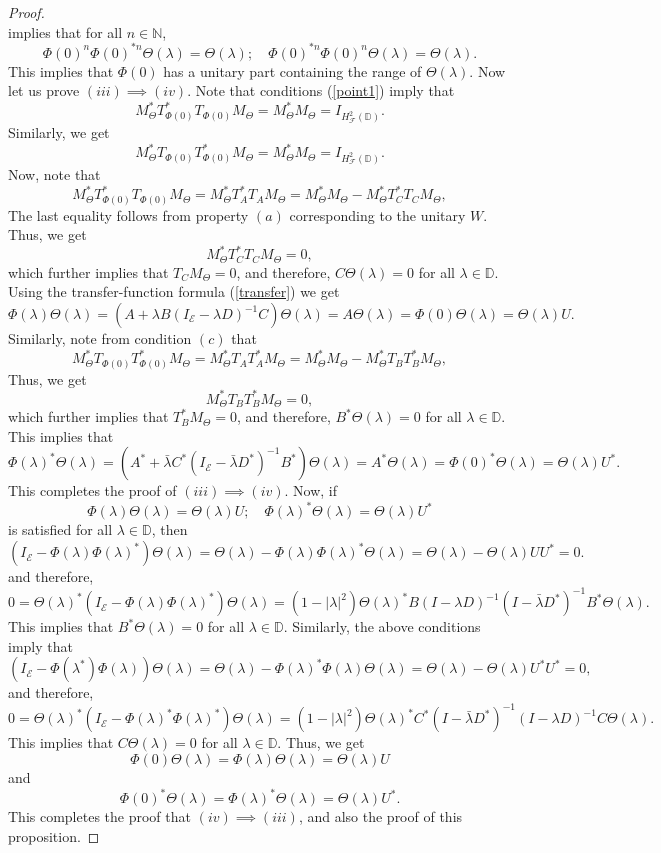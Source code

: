\documentclass[12pt]{amsart}
\numberwithin{equation}{section}
\theoremstyle{definition}
\newcommand{\Nat}{\mathbb{N}}
\newcommand{\D}{\mathbb{D}}
\newcommand{\1}{{\mbox{\bf 1}}}
\newcommand{\cle}{\mathcal{E}}
\newcommand{\clf}{\mathcal{F}}
\begin{document}
\begin{proof}
\[\]
implies that for all $n \in \Nat$,
\[
\Phi(0)^{n} \Phi(0)^{*n} \Theta(\lambda)  = \Theta(\lambda); \quad \Phi(0)^{*n} \Phi(0)^{n} \Theta(\lambda) =  \Theta(\lambda).
\]
This implies that $\Phi(0)$ has a unitary part containing the range of  $\Theta(\lambda)$. Now let us prove  $(iii) \implies (iv)$. Note that conditions (\ref{point1}) imply that
\[
M_{\Theta}^* T_{\Phi(0)}^* T_{\Phi(0)}M_{\Theta} = M_{\Theta}^*M_{\Theta} = I_{H_{\clf}^2(\D)}.
\]
Similarly, we get
\[
M_{\Theta}^* T_{\Phi(0)} T_{\Phi(0)}^*M_{\Theta} = M_{\Theta}^*M_{\Theta} = I_{H_{\clf}^2(\D)}.
\]
Now, note that 
\[
M_{\Theta}^* T_{\Phi(0)}^* T_{\Phi(0)}M_{\Theta} = M_{\Theta}^*  T_A^* T_A M_{\Theta}  = M_{\Theta}^* M_{\Theta} - M_{\Theta}^*  T_C^* T_C M_{\Theta},
\]
The last equality follows from property $(a)$ corresponding to the unitary $W$. Thus, we get 
\[
M_{\Theta}^*  T_C^* T_C M_{\Theta} = 0,
\]
which further implies that $T_C M_{\Theta} = 0$, and therefore, $C \Theta(\lambda) = 0$ for all $\lambda \in \D$.  Using the transfer-function formula (\ref{transfer}) we get
\[
\Phi(\lambda) \Theta(\lambda) = ( A + \lambda B (I_{\cle} - \lambda D)^{-1} C)\Theta(\lambda) = A \Theta(\lambda) = \Phi(0) \Theta(\lambda) = \Theta(\lambda) U.
\]
Similarly, note from condition $(c)$ that 
\[
M_{\Theta}^* T_{\Phi(0)} T_{\Phi(0)}^*M_{\Theta} = M_{\Theta}^*  T_A T_A^* M_{\Theta}  = M_{\Theta}^* M_{\Theta} - M_{\Theta}^*  T_B T_B^* M_{\Theta},
\]
Thus, we get 
\[
M_{\Theta}^*  T_B T_B^* M_{\Theta} = 0,
\]
which further implies that $ T_B^* M_{\Theta} = 0$, and therefore, $B^* \Theta(\lambda) = 0$ for all $\lambda \in \D$. This implies that 
\[
\Phi(\lambda)^* \Theta(\lambda) = ( A^* + \bar{\lambda} C^* (I_{\cle} - \bar{\lambda} D^*)^{-1} B^*)\Theta(\lambda) = A^* \Theta(\lambda) = \Phi(0)^* \Theta(\lambda) = \Theta(\lambda) U^*.
\]
This completes the proof of $(iii) \implies (iv)$. Now, if 
\[
\Phi(\lambda) \Theta(\lambda) = \Theta(\lambda) U; \quad \Phi(\lambda)^* \Theta(\lambda) = \Theta(\lambda) U^*
\]
is satisfied for all $\lambda \in \D$, then
\[
(I_{\cle} - \Phi(\lambda) \Phi(\lambda)^*) \Theta(\lambda) = \Theta(\lambda) -\Phi(\lambda) \Phi(\lambda)^*  \Theta(\lambda)
=  \Theta(\lambda) - \Theta(\lambda) U U^*
=0.
\]
and therefore,
\[
0 = \Theta(\lambda)^* (I_{\cle} - \Phi(\lambda) \Phi(\lambda)^*) \Theta(\lambda) = (1 - |\lambda|^2)  \Theta(\lambda)^* B (I - \lambda D)^{-1}  (I - \bar{\lambda}  D^*)^{-1}  B^* \Theta(\lambda).
\]
This implies that $B^* \Theta(\lambda) = 0$ for all $\lambda \in \D$. Similarly, the above conditions imply that
\[
(I_{\cle} - \Phi(\lambda^*) \Phi(\lambda)) \Theta(\lambda) = \Theta(\lambda) -\Phi(\lambda)^* \Phi(\lambda) \Theta(\lambda) 
=  \Theta(\lambda) - \Theta(\lambda) U^* U^*
=0,
\]
and therefore,
\[
0 = \Theta(\lambda)^* (I_{\cle} - \Phi(\lambda)^* \Phi(\lambda)^*) \Theta(\lambda) = (1 - |\lambda|^2)  \Theta(\lambda)^* C^* (I - \bar{\lambda} D^*)^{-1}  (I - \lambda  D)^{-1}  C \Theta(\lambda).
\]
This implies that $C \Theta(\lambda) = 0$ for all $\lambda \in \D$. Thus, we get
\[
\Phi(0) \Theta(\lambda) = \Phi(\lambda) \Theta(\lambda) = \Theta(\lambda) U 
\]
and
\[
\Phi(0)^* \Theta(\lambda) = \Phi(\lambda)^* \Theta(\lambda) = \Theta(\lambda) U^*. 
\]
This completes the proof that $(iv) \implies (iii)$, and also the proof of this proposition.
\end{proof}
\end{document}
